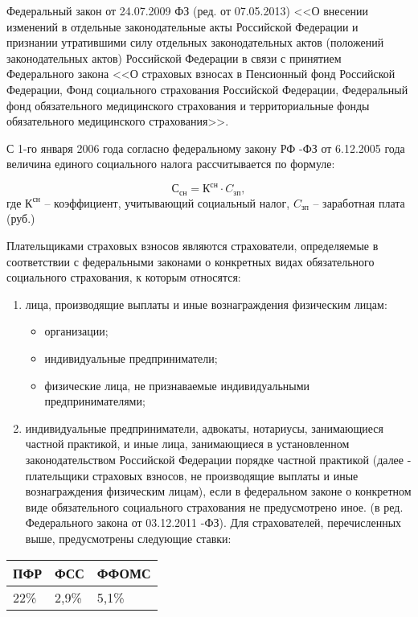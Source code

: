 Федеральный закон от 24.07.2009  ФЗ (ред. от 07.05.2013) <<О внесении изменений в отдельные законодательные акты Российской Федерации и признании утратившими силу отдельных законодательных актов (положений законодательных актов) Российской Федерации в связи с принятием Федерального закона <<О страховых взносах в Пенсионный фонд Российской Федерации, Фонд социального страхования Российской Федерации, Федеральный фонд обязательного медицинского страхования и территориальные фонды обязательного медицинского страхования>>.

С 1-го января 2006 года согласно федеральному закону РФ -ФЗ от 6.12.2005 года величина единого социального налога рассчитывается по формуле:

$$ С_{сн}=К^{сн} \cdot C_{зп},$$
где $К^{сн}$ – коэффициент, учитывающий социальный налог, $C_{зп}$ – заработная плата (руб.)

Плательщиками страховых взносов являются страхователи, определяемые в соответствии с федеральными законами о конкретных видах обязательного социального страхования, к которым относятся:
\begin{enumerate}
\item лица, производящие выплаты и иные вознаграждения физическим лицам: 
\begin{itemize}
\item организации;
\item индивидуальные предприниматели;
\item физические лица, не признаваемые индивидуальными предпринимателями;
\end{itemize}
\item индивидуальные предприниматели, адвокаты, нотариусы, занимающиеся частной практикой, и иные лица, занимающиеся в установленном законодательством Российской Федерации порядке частной практикой (далее - плательщики страховых взносов, не производящие выплаты и иные вознаграждения физическим лицам), если в федеральном законе о конкретном виде обязательного социального страхования не предусмотрено иное.
(в ред. Федерального закона от 03.12.2011 -ФЗ).
Для страхователей, перечисленных выше, предусмотрены следующие ставки:
\end{enumerate}
\begin{table}[htb]
    \centering
        \begin{tabular}{|l|l|l|}
        		\hline
        		ПФР & ФСС & ФФОМС \\
        		\hline
        		22\% & 2,9\% & 5,1\% \\
        		\hline
        \end{tabular}   		
\end{table}


